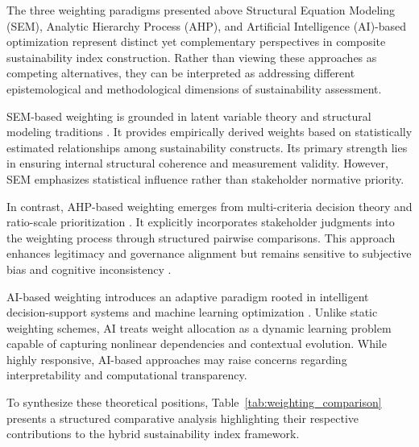 \documentclass[11pt,a4paper]{article}
\begin{document}
The three weighting paradigms presented above Structural Equation Modeling (SEM), Analytic Hierarchy Process (AHP), and Artificial Intelligence (AI)-based optimization represent distinct yet complementary perspectives in composite sustainability index construction. Rather than viewing these approaches as competing alternatives, they can be interpreted as addressing different epistemological and methodological dimensions of sustainability assessment.

SEM-based weighting is grounded in latent variable theory and structural modeling traditions \cite{Bollen1989,Kline2016}. It provides empirically derived weights based on statistically estimated relationships among sustainability constructs. Its primary strength lies in ensuring internal structural coherence and measurement validity. However, SEM emphasizes statistical influence rather than stakeholder normative priority.

In contrast, AHP-based weighting emerges from multi-criteria decision theory and ratio-scale prioritization \cite{Saaty1980,Saaty2008}. It explicitly incorporates stakeholder judgments into the weighting process through structured pairwise comparisons. This approach enhances legitimacy and governance alignment but remains sensitive to subjective bias and cognitive inconsistency \cite{Cinelli2014}.

AI-based weighting introduces an adaptive paradigm rooted in intelligent decision-support systems and machine learning optimization \cite{Lu2019,Yu2015}. Unlike static weighting schemes, AI treats weight allocation as a dynamic learning problem capable of capturing nonlinear dependencies and contextual evolution. While highly responsive, AI-based approaches may raise concerns regarding interpretability and computational transparency.

To synthesize these theoretical positions, Table~\ref{tab:weighting_comparison} presents a structured comparative analysis highlighting their respective contributions to the hybrid sustainability index framework.
\end{document}
